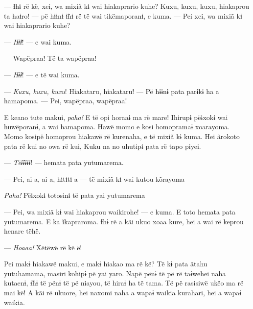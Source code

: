 --- Ɨhɨ rë kë, xei, wa mixiã kɨ wai hiakaprario kuhe? Kuxu, kuxu, kuxu,
hiakaprou ta haɨro! --- pë hɨɨnɨ ɨ̃hɨ rë të wai tikëmaporanɨ, e kuma. ---
Pei xei, wa mixiã kɨ wai hiakaprario kuhe?

--- \textit{Hɨ̃ɨ}! --- e wai kuma. 

--- Wapëpraa! Të ta wapëpraa! 

--- \textit{Hɨ̃ɨ}! --- e të wai kuma. 


--- \textit{Kuxu, kuxu, kuxu}! Hiakataru, hiakataru! --- Pë hɨɨnɨ pata parɨkɨ ha a
hamapoma. --- Pei, wapëpraa, wapëpraa! 

E keano tute makui, \textit{paha!} E të opi horaaɨ ma rë mare! Ihirupɨ pëɨxokɨ
wai huwëporanɨ, a wai hamapoma. Hawë momo e kosi homopramaɨ xoarayoma.
Momo kosipë homoprou hiakawë rë kurenaha, e të mixiã kɨ kuma. Hei
ãrokoto pata rë kui no owa rë kui, Kuku na no uhutipɨ pata rë tapo
piyei. 

--- \textit{Tëɨ̃ɨɨɨɨ}! --- hemata pata yutumarema. 

--- Pei, ai a, ai a, hɨtɨtɨ a --- të mixiã kɨ wai kutou kõrayoma 

\textit{Paha!} Pëɨxokɨ totosinɨ të pata yai yutumarema 

--- Pei, wa mixiã kɨ wai hiakaprou waikirohe! --- e kuma. E toto hemata
pata yutumarema. E ka ĩkapraroma. Ɨhɨ rë a kãi ukuo xoaa kure, hei a wai
rë keprou henare tëhë. 

--- \textit{Hoaaa!} Xëtëwë rë kë ë! 


Pei makɨ hiakawë makui, e makɨ hiakao ma rë kë? Të kɨ pata ãtahu
yutuhamama, masiri kohipɨ pë yai yaro. Napë pënɨ të pë rë taɨwehei naha
kutaenɨ, ɨ̃hɨ të pënɨ të pë niayou, të hiraɨ ha të tama. Të pë rasisiwë
ukëo ma rë mai kë! A kãi rë ukuore, hei naxomi naha a wapaɨ waikia
kurahari, hei a wapaɨ waikia. 



